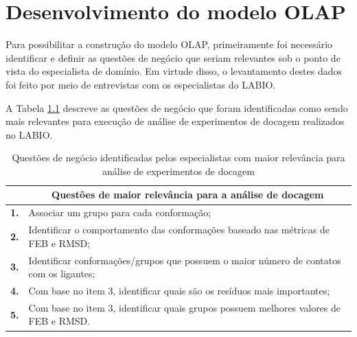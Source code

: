 \chapter{Desenvolvimento do modelo OLAP}

Para possibilitar a construção do modelo OLAP, primeiramente foi necessário identificar e definir as questões de negócio que seriam relevantes sob o ponto de vista do especialista de domínio. Em virtude disso, o levantamento destes dados foi feito por meio de entrevistas com os especialistas do LABIO.

A Tabela \ref{tab:questaoNegocio} descreve as questões de negócio que foram identificadas como sendo mais relevantes para execução de análise de experimentos de docagem realizados no LABIO. 

\begin{table}[h]
\caption{Questões de negócio identificadas pelos especialistas com maior relevância para análise de experimentos de docagem}
\label{tab:questaoNegocio}
\centering
\begin{tabular}{@{}ll@{}}
\toprule
\textbf{ } & \multicolumn{1}{c}{\textbf{Questões de maior relevância para a análise de docagem}}		\\ \midrule
\textbf{1.} & Associar um grupo para cada conformação;													\\
\textbf{2.} & Identificar o comportamento das conformações baseado nas métricas de FEB e RMSD;			\\
\textbf{3.} & Identificar conformações/grupos que possuem o maior número de contatos com os ligantes;	\\
\textbf{4.} & Com base no item 3, identificar quais são os resíduos mais importantes;					\\
\textbf{5.} & Com base no item 3, identificar quais grupos possuem melhores valores de FEB e RMSD.		\\ \bottomrule
\end{tabular}
\end{table}

